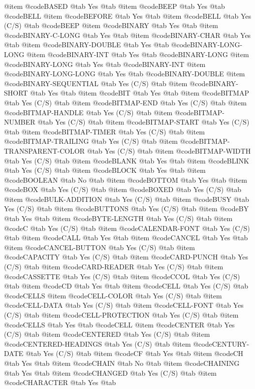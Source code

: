 @item @code{BASED} @tab Yes @tab
@item @code{BEEP} @tab Yes @tab @code{BELL}
@item @code{BEFORE} @tab Yes @tab
@item @code{BELL} @tab Yes	(C/S) @tab @code{BEEP}
@item @code{BINARY} @tab Yes @tab
@item @code{BINARY-C-LONG} @tab Yes @tab
@item @code{BINARY-CHAR} @tab Yes @tab
@item @code{BINARY-DOUBLE} @tab Yes @tab @code{BINARY-LONG-LONG}
@item @code{BINARY-INT} @tab Yes @tab @code{BINARY-LONG}
@item @code{BINARY-LONG} @tab Yes @tab @code{BINARY-INT}
@item @code{BINARY-LONG-LONG} @tab Yes @tab @code{BINARY-DOUBLE}
@item @code{BINARY-SEQUENTIAL} @tab Yes	(C/S) @tab
@item @code{BINARY-SHORT} @tab Yes @tab
@item @code{BIT} @tab Yes @tab
@item @code{BITMAP} @tab Yes	(C/S) @tab
@item @code{BITMAP-END} @tab Yes	(C/S) @tab
@item @code{BITMAP-HANDLE} @tab Yes	(C/S) @tab
@item @code{BITMAP-NUMBER} @tab Yes	(C/S) @tab
@item @code{BITMAP-START} @tab Yes	(C/S) @tab
@item @code{BITMAP-TIMER} @tab Yes	(C/S) @tab
@item @code{BITMAP-TRAILING} @tab Yes	(C/S) @tab
@item @code{BITMAP-TRANSPARENT-COLOR} @tab Yes	(C/S) @tab
@item @code{BITMAP-WIDTH} @tab Yes	(C/S) @tab
@item @code{BLANK} @tab Yes @tab
@item @code{BLINK} @tab Yes	(C/S) @tab
@item @code{BLOCK} @tab Yes @tab
@item @code{BOOLEAN} @tab No @tab
@item @code{BOTTOM} @tab Yes @tab
@item @code{BOX} @tab Yes	(C/S) @tab
@item @code{BOXED} @tab Yes	(C/S) @tab
@item @code{BULK-ADDITION} @tab Yes	(C/S) @tab
@item @code{BUSY} @tab Yes	(C/S) @tab
@item @code{BUTTONS} @tab Yes	(C/S) @tab
@item @code{BY} @tab Yes @tab
@item @code{BYTE-LENGTH} @tab Yes	(C/S) @tab
@item @code{C} @tab Yes	(C/S) @tab
@item @code{CALENDAR-FONT} @tab Yes	(C/S) @tab
@item @code{CALL} @tab Yes @tab
@item @code{CANCEL} @tab Yes @tab
@item @code{CANCEL-BUTTON} @tab Yes	(C/S) @tab
@item @code{CAPACITY} @tab Yes	(C/S) @tab
@item @code{CARD-PUNCH} @tab Yes	(C/S) @tab
@item @code{CARD-READER} @tab Yes	(C/S) @tab
@item @code{CASSETTE} @tab Yes	(C/S) @tab
@item @code{CCOL} @tab Yes	(C/S) @tab
@item @code{CD} @tab Yes @tab
@item @code{CELL} @tab Yes	(C/S) @tab @code{CELLS}
@item @code{CELL-COLOR} @tab Yes	(C/S) @tab
@item @code{CELL-DATA} @tab Yes	(C/S) @tab
@item @code{CELL-FONT} @tab Yes	(C/S) @tab
@item @code{CELL-PROTECTION} @tab Yes	(C/S) @tab
@item @code{CELLS} @tab Yes @tab @code{CELL}
@item @code{CENTER} @tab Yes	(C/S) @tab
@item @code{CENTERED} @tab Yes	(C/S) @tab
@item @code{CENTERED-HEADINGS} @tab Yes	(C/S) @tab
@item @code{CENTURY-DATE} @tab Yes	(C/S) @tab
@item @code{CF} @tab Yes @tab
@item @code{CH} @tab Yes @tab
@item @code{CHAIN} @tab No @tab
@item @code{CHAINING} @tab Yes @tab
@item @code{CHANGED} @tab Yes (C/S) @tab
@item @code{CHARACTER} @tab Yes @tab
